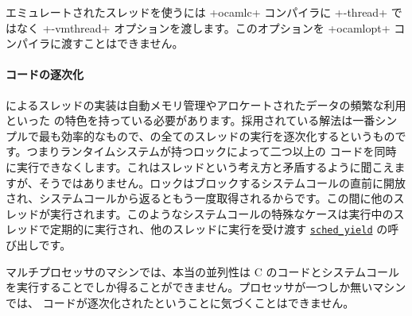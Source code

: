 エミュレートされたスレッドを使うには \ml+ocamlc+ コンパイラに \ml+-thread+ ではなく \ml+-vmthread+ オプションを渡します。このオプションを \ml+ocamlopt+ コンパイラに渡すことはできません。

\paragraph{{\ocaml} コードの逐次化}

\ocaml によるスレッドの実装は自動メモリ管理やアロケートされたデータの頻繁な利用といった \ocaml の特色を持っている必要があります。採用されている解法は一番シンプルで最も効率的なもので、\ocaml の全てのスレッドの実行を逐次化するというものです。つまりランタイムシステムが持つロックによって二つ以上の \ocaml コードを同時に実行できなくします。これはスレッドという考え方と矛盾するように聞こえますが、そうではありません。ロックはブロックするシステムコールの直前に開放され、システムコールから返るともう一度取得されるからです。この間に他のスレッドが実行されます。このようなシステムコールの特殊なケースは実行中のスレッドで定期的に実行され、他のスレッドに実行を受け渡す \href{http://www.opengroup.org/onlinepubs/007908799/xsh/sched_yield.html}{\texttt{sched\_yield}} の呼び出しです。

マルチプロセッサのマシンでは、本当の並列性は C のコードとシステムコールを実行することでしか得ることができません。プロセッサが一つしか無いマシンでは、 \ocaml コードが逐次化されたということに気づくことはできません。

